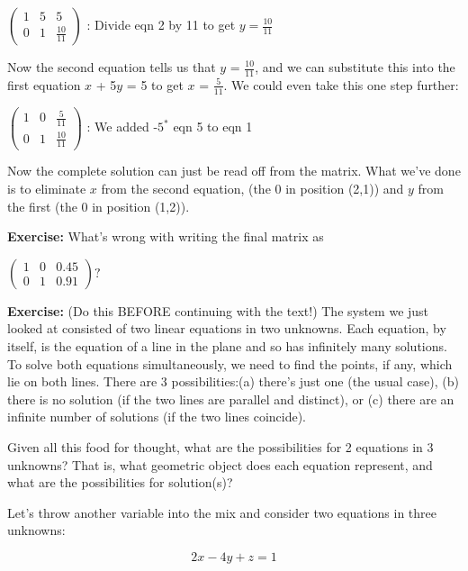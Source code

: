 \documentclass{book}
\begin{document}
			\hspace{1cm} $\begin{pmatrix} 1 & 5 & 5 \\ 0 & 1 & \frac{10}{11} \end{pmatrix}$ : Divide eqn 2 by 11 to get $y = \frac{10}{11}$ 


				Now the second equation tells us that $y$ = $\frac{10}{11}$, and we can substitute this into the first equation $x$ + 5$y$ = 5 to get $x$ = $\frac{5}{11}$. We could even take this one step further:

\hspace{1cm} 	$\begin{pmatrix} 1 & 0 & \frac{5}{11} \\ 0 & 1 & \frac{10}{11} \end{pmatrix}$ : We added -$5^*$ eqn 5 to eqn 1

Now the complete solution can just be read off from the matrix. What we’ve done is to eliminate $x$ from the second equation, (the 0 in position (2,1)) and $y$ from the first (the 0 in position (1,2)).

\textbf{Exercise:} What’s wrong with writing the final matrix as 

$\begin{pmatrix} 1 & 0 & 0.45 \\ 0 & 1 & 0.91 \end{pmatrix} ?$ 

	\textbf{Exercise:} (Do this BEFORE continuing with the text!) The system we just looked at consisted of two linear equations in two unknowns. Each equation, by itself, is the equation of a line in the plane and so has infinitely many solutions. To solve both equations simultaneously, we need to find the points, if any, which lie on both lines. There are 3 possibilities:(a) there\rq s just one (the usual case), (b) there is no solution (if the two lines are parallel and distinct), or (c) there are an infinite number of solutions (if the two lines coincide).

Given all this food for thought, what are the possibilities for 2 equations in 3 unknowns? That is, what geometric object does each equation represent, and what are the possibilities for solution(s)?

Let\rq s throw another variable into the mix and consider two equations in three unknowns:

\begin{equation} \label{eq}
2x − 4y + z = 1
\end{equation}
\end{document}
